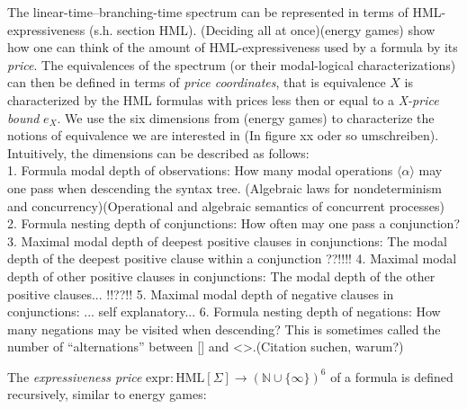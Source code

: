 %
\begin{isabellebody}%
%
%
\isadelimtheory
%
\endisadelimtheory
%
\isatagtheory
%
\endisatagtheory
{\isafoldtheory}%
%
\isadelimtheory
%
\endisadelimtheory
%
\isadelimdocument
%
\endisadelimdocument
%
\isatagdocument
%
\isamarkuptrue%
%
\endisatagdocument
{\isafolddocument}%
%
\isadelimdocument
%
\endisadelimdocument
%
\begin{isamarkuptext}%
The linear-time--branching-time spectrum can be represented in terms of HML-expressiveness (s.h. section HML).
(Deciding all at once)(energy games) show how one can think of the amount of HML-expressiveness used by a formula by its \textit{price}.
The equivalences of the spectrum (or their modal-logical characterizations) can then be defined in terms of \textit{price coordinates}, that is
equivalence $X$ is characterized by the HML formulas with prices less then or equal to a \textit{X-price bound} $e_X$.
We use the six dimensions from (energy games) to characterize the notions of equivalence we are interested in (In figure xx oder so umschreiben).
Intuitively, the dimensions can be described as follows:\\
1. Formula modal depth of observations: How many modal operations $\langle \alpha \rangle$ may one pass when descending the syntax tree. (Algebraic laws for nondeterminism and concurrency)(Operational and algebraic semantics of concurrent processes)\\
2. Formula nesting depth of conjunctions: How often may one pass a conjunction?
3. Maximal modal depth of deepest positive clauses in conjunctions: The modal depth of the deepest positive clause within a conjunction ??!!!!
4. Maximal modal depth of other positive clauses in conjunctions: The modal depth of the other positive clauses... !!??!!
5. Maximal modal depth of negative clauses in conjunctions: ... self explanatory...
6. Formula nesting depth of negations: How many negations may be visited when descending? This is sometimes called the number of ``alternations'' between [] and <>.(Citation suchen, warum?)%
\end{isamarkuptext}\isamarkuptrue%
%
\isadelimdocument
%
\endisadelimdocument
%
\isatagdocument
%
\isamarkuptrue%
%
\endisatagdocument
{\isafolddocument}%
%
\isadelimdocument
%
\endisadelimdocument
%
\begin{isamarkuptext}%
The \textit{expressiveness price} $\text{expr}: \text{HML}[\Sigma] \rightarrow (\mathbb{N} \cup \{\infty\})^6$ of a formula is defined recursively, similar to energy games:


\end{isamarkuptext}
\end{isabellebody}
